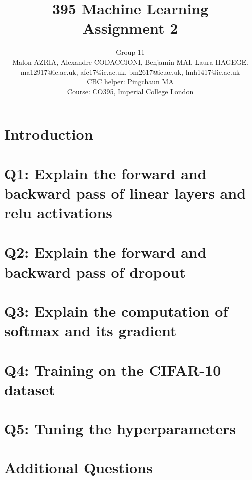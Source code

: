 \documentclass[a4paper,11pt]{article}
\title{395 Machine Learning\\\Large{--- Assignment 2 ---}}
\author{Group 11\\Malon AZRIA, Alexandre CODACCIONI, Benjamin MAI,
  Laura HAGEGE.\\
  ma12917@ic.ac.uk, afc17@ic.ac.uk, bm2617@ic.ac.uk, lmh1417@ic.ac.uk \\
       \small{CBC helper: Pingchaun MA}\\
       \small{Course: CO395, Imperial College London}
}
\begin{document}
\maketitle

\section{Introduction}
    

\section{Q1: Explain the forward and backward pass of linear layers and relu activations}
    

\section{Q2: Explain the forward and backward pass of dropout}
    

\newpage
\section{Q3: Explain the computation of softmax and its gradient}
    

\newpage
\section{Q4: Training on the CIFAR-10 dataset}
    

\section{Q5: Tuning the hyperparameters}
    

\section{Additional Questions}
    
\end{document}
